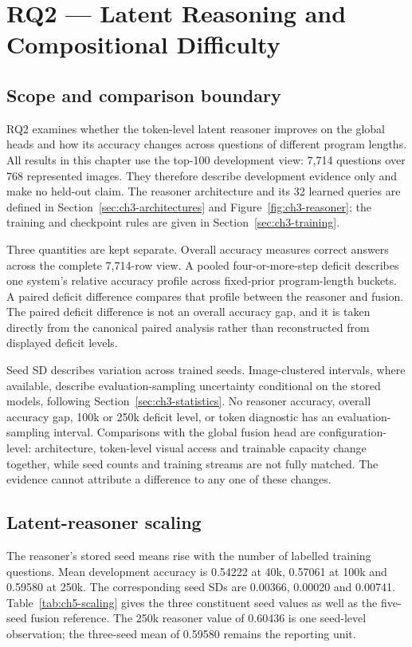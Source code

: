 \chapter{RQ2 — Latent Reasoning and Compositional Difficulty}

\section{Scope and comparison boundary}
\label{sec:ch5-scope}
RQ2 examines whether the token-level latent reasoner improves on the global
heads and how its accuracy changes across questions of different program
lengths. All results in this chapter use the top-100 development view: 7,714
questions over 768 represented images. They therefore describe development
evidence only and make no held-out claim. The reasoner architecture and its
32 learned queries are defined in Section~\ref{sec:ch3-architectures} and
Figure~\ref{fig:ch3-reasoner}; the training and checkpoint rules are given in
Section~\ref{sec:ch3-training}.

Three quantities are kept separate. Overall accuracy measures correct answers
across the complete 7,714-row view. A pooled four-or-more-step deficit describes
one system's relative accuracy profile across fixed-prior program-length
buckets. A paired deficit difference compares that profile between the
reasoner and fusion. The paired deficit difference is not an overall accuracy
gap, and it is taken directly from the canonical paired analysis rather than
reconstructed from displayed deficit levels.

Seed SD describes variation across trained seeds. Image-clustered intervals,
where available, describe evaluation-sampling uncertainty conditional on the
stored models, following Section~\ref{sec:ch3-statistics}. No reasoner
accuracy, overall accuracy gap, 100k or 250k deficit level, or token diagnostic
has an evaluation-sampling interval. Comparisons with the global fusion head
are configuration-level: architecture, token-level visual access and trainable
capacity change together, while seed counts and training streams are not fully
matched. The evidence cannot attribute a difference to any one of these
changes.

\section{Latent-reasoner scaling}
\label{sec:ch5-scaling}
The reasoner's stored seed means rise with the number of labelled training
questions. Mean development accuracy is 0.54222 at 40k, 0.57061 at 100k and
0.59580 at 250k. The corresponding seed SDs are 0.00366, 0.00020 and 0.00741.
Table~\ref{tab:ch5-scaling} gives the three constituent seed values as well as
the five-seed fusion reference. The 250k reasoner value of 0.60436 is one
seed-level observation; the three-seed mean of 0.59580 remains the reporting
unit.

